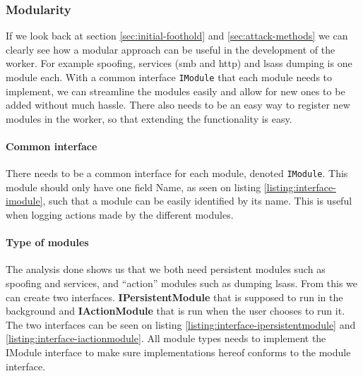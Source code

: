 \documentclass{article}
\begin{document}
\subsubsection{Modularity}
If we look back at section \ref{sec:initial-foothold} and \ref{sec:attack-methods} we can clearly see how a modular approach can be useful in the development of the worker. For example spoofing, services (\gls{smb} and \gls{http}) and \gls{lsass} dumping is one module each. With a common interface \texttt{IModule} that each module needs to implement, we can streamline the modules easily and allow for new ones to be added without much hassle. There also needs to be an easy way to register new modules in the worker, so that extending the functionality is easy.

\paragraph{Common interface} There needs to be a common interface for each module, denoted \texttt{IModule}. This module should only have one field Name, as seen on listing \ref{listing:interface-imodule}, such that a module can be easily identified by its name. This is useful when logging actions made by the different modules.


\paragraph{Type of modules} The analysis done shows us that we both need persistent modules such as spoofing and services, and \enquote{action} modules such as dumping \gls{lsass}. From this we can create two interfaces. \textbf{IPersistentModule} that is supposed to run in the background and \textbf{IActionModule} that is run when the user chooses to run it. The two interfaces can be seen on listing \ref{listing:interface-ipersistentmodule} and \ref{listing:interface-iactionmodule}. All module types needs to implement the IModule interface to make sure implementations hereof conforms to the module interface.
\end{document}
